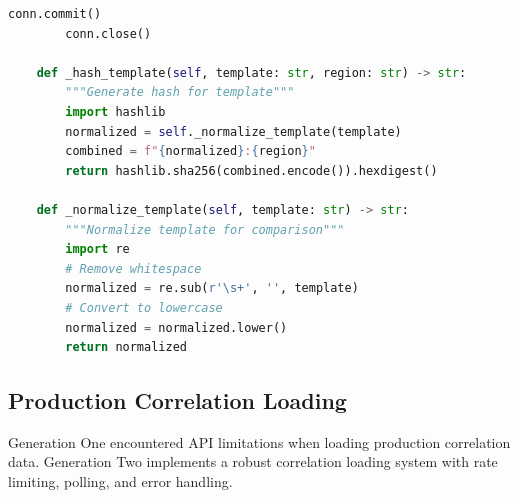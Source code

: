 \begin{lstlisting}[language=Python, caption=Alpha Pool Diversification]
        conn.commit()
        conn.close()
    
    def _hash_template(self, template: str, region: str) -> str:
        """Generate hash for template"""
        import hashlib
        normalized = self._normalize_template(template)
        combined = f"{normalized}:{region}"
        return hashlib.sha256(combined.encode()).hexdigest()
    
    def _normalize_template(self, template: str) -> str:
        """Normalize template for comparison"""
        import re
        # Remove whitespace
        normalized = re.sub(r'\s+', '', template)
        # Convert to lowercase
        normalized = normalized.lower()
        return normalized
\end{lstlisting}

\subsection{Production Correlation Loading}

Generation One encountered API limitations when loading production correlation data. Generation Two implements a robust correlation loading system with rate limiting, polling, and error handling.

